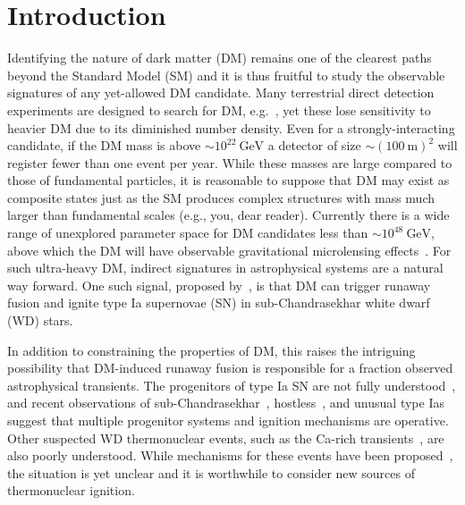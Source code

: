 \documentclass[preprintnumbers,amsmath,amssymb,prd,superscriptaddress]{revtex4}
\newcommand{\GeV}{\text{GeV}}
\begin{document}
\section{Introduction}
\label{sec:intro}
Identifying the nature of dark matter (DM) remains one of the clearest paths beyond the Standard Model (SM) and it is thus fruitful to study the observable signatures of any yet-allowed DM candidate.
Many terrestrial direct detection experiments are designed to search for DM, e.g.~\cite{Akerib:2016vxi, Agnese:2017njq}, yet these lose sensitivity to heavier DM due to its diminished number density.
Even for a strongly-interacting candidate, if the DM mass is above $\sim 10^{22}~\GeV$ a detector of size $\sim (100~\text{m})^2$ will register fewer than one event per year.
While these masses are large compared to those of fundamental particles, it is reasonable to suppose that DM may exist as composite states just as the SM produces complex structures with mass much larger than fundamental scales (e.g., you, dear reader).
Currently there is a wide range of unexplored parameter space for DM candidates less than $\sim 10^{48}~\GeV$, above which the DM will have observable gravitational microlensing effects~\cite{Griest:2013aaa}.
For such ultra-heavy DM, indirect signatures in astrophysical systems are a natural way forward.
One such signal, proposed by~\cite{Graham:2015apa}, is that DM can trigger runaway fusion and ignite type Ia supernovae (SN) in sub-Chandrasekhar white dwarf (WD) stars.

In addition to constraining the properties of DM, this raises the intriguing possibility that DM-induced runaway fusion is responsible for a fraction observed astrophysical transients. 
The progenitors of type Ia SN are not fully understood~\cite{
Maoz:2012}, and recent observations of sub-Chandrasekhar~\cite{Scalzo:2014sap, Scalzo:2014wxa}, hostless~\cite{McGee:2010}, and unusual type Ias~\cite{Foley:2013} suggest that multiple progenitor systems and ignition mechanisms are operative.
Other suspected WD thermonuclear events, such as the Ca-rich transients~\cite{Kasliwal:2012}, are also poorly understood. 
While mechanisms for these events have been proposed~\cite{Woosley1994,Fink:2007fv,Pakmor:2013wia,Sell:2015rfa}, the situation is yet unclear and it is worthwhile to consider new sources of thermonuclear ignition. 
\end{document}
